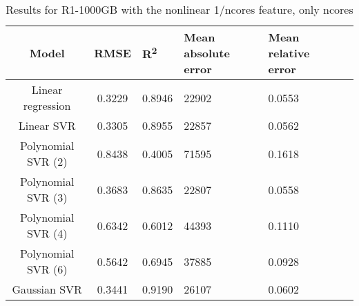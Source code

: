 \begin{table}[H]
\centering
\begin{adjustbox}{center}
\begin{tabular}{c | c M{1.2cm} M{2.5cm} M{2.5cm} M{1.8cm}}
Model & RMSE & R\textsuperscript{2} & Mean absolute error & Mean relative error \tabularnewline
\hline
Linear regression & 0.3229 & 0.8946 &  22902 & 0.0553 \\
Linear SVR & 0.3305 & 0.8955 &  22857 & 0.0562 \\
Polynomial SVR (2) & 0.8438 & 0.4005 &  71595 & 0.1618 \\
Polynomial SVR (3) & 0.3683 & 0.8635 &  22807 & 0.0558 \\
Polynomial SVR (4) & 0.6342 & 0.6012 &  44393 & 0.1110 \\
Polynomial SVR (6) & 0.5642 & 0.6945 &  37885 & 0.0928 \\
Gaussian SVR & 0.3441 & 0.9190 &  26107 & 0.0602 \\
\end{tabular}
\end{adjustbox}
\\
\caption{Results for R1-1000GB with the nonlinear 1/ncores feature, only ncores}
\label{tab:all_nonlinear_R1_1000}
\end{table}
